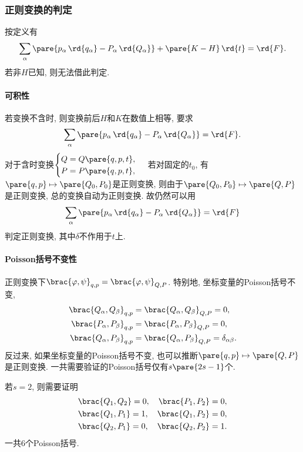 \documentclass[../LectureNotes.tex]{subfiles}
\begin{document}

\subsubsection{正则变换的判定} %
\label{ssub:正则变换的判定}

按定义有
\[ \sum_\alpha \pare{p_\alpha\,\rd{q_\alpha} - P_\alpha\,\rd{Q_\alpha}} + \pare{K-H}\,\rd{t} = \rd{F}. \]
若非$H$已知, 则无法借此判定.

\paragraph{可积性} %
\label{par:可积性}

若变换不含时, 则变换前后$H$和$K$在数值上相等, 要求
\[ \sum_\alpha \pare{p_\alpha\,\rd{q_\alpha} - P_\alpha\,\rd{Q_\alpha}} = \rd{F}. \]
对于含时变换$\begin{cases}
    Q = Q\pare{q,p,t}, \\
    P = P\pare{q,p,t},
\end{cases}$ 若对固定的$t_0$, 有$\pare{q,p}\mapsto \pare{Q_0,P_0}$是正则变换, 则由于$\pare{Q_0,P_0}\mapsto \pare{Q,P}$是正则变换, 总的变换自动为正则变换. 故仍然可以用
\[ \sum_\alpha \pare{p_\alpha\,\rd{q_\alpha} - P_\alpha\,\rd{Q_\alpha}} = \rd{F} \]
判定正则变换, 其中$\delta$不作用于$t$上.


\paragraph{Poisson括号不变性} %
\label{par:poisson括号不变性}

正则变换下$\brac{\varphi,\psi}_{q,p} = \brac{\varphi,\psi}_{Q,P}$. 特别地, 坐标变量的Poisson括号不变,
\begin{align*}
    \brac{Q_\alpha,Q_\beta}_{q,p} &= \brac{Q_\alpha,Q_\beta}_{Q,P} = 0, \\
    \brac{P_\alpha,P_\beta}_{q,p} &= \brac{P_\alpha,P_\beta}_{Q,P} = 0, \\
    \brac{Q_\alpha,P_\beta}_{q,p} &= \brac{Q_\alpha,P_\beta}_{Q,P} = \delta_{\alpha\beta}.
\end{align*}
反过来, 如果坐标变量的Poisson括号不变, 也可以推断$\pare{q,p}\mapsto\pare{Q,P}$是正则变换. 一共需要验证的Poisson括号仅有$s\pare{2s-1}$个.
\begin{ex}
    若$s=2$, 则需要证明
    \begin{align*}
        \brac{Q_1,Q_2} = 0,\quad \brac{P_1,P_2} = 0, \\
        \brac{Q_1,P_1} = 1,\quad \brac{Q_1,P_2} = 0, \\
        \brac{Q_2,P_1} = 0,\quad \brac{Q_2,P_2} = 1.
    \end{align*}
    一共$6$个Poisson括号.
\end{ex}
\end{document}
